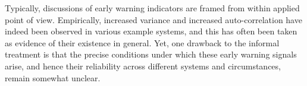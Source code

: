 Typically, discussions of early warning indicators are framed from within applied point of view. Empirically, increased variance and increased auto-correlation have indeed been observed in various example systems, and this has often been taken as evidence of their existence in general. Yet, one drawback to the informal treatment is that the precise conditions under which these early warning signals arise, and hence their reliability across different systems and circumstances, remain somewhat unclear. 




	
